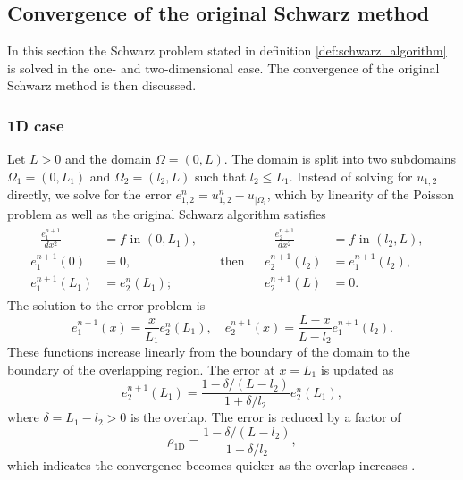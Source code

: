 \subsection{Convergence of the original Schwarz method} \label{sec:schwarz_convergence}
In this section the Schwarz problem stated in definition \ref{def:schwarz_algorithm} is solved in the one- and two-dimensional case. The convergence of the original Schwarz method is then discussed.

\subsubsection{1D case}
Let $L>0$ and the domain $\Omega = (0,L)$. The domain is split into two subdomains $\Omega_1 = (0,L_1)$ and $\Omega_2 = (l_2,L)$ such that $l_2\leq L_1$. Instead of solving for $u_{1,2}$ directly, we solve for the error $e^n_{1,2} = u^{n}_{1,2} - u_{|\Omega_i}$, which by linearity of the Poisson problem as well as the original Schwarz algorithm satisfies
\[
    \begin{array}{cc}
        \begin{aligned}
            -\frac{e_1^{n+1}}{d x^2} & = f           \text { in } (0,L_1), &                   \\
            e_1^{n+1}(0)             & = 0,                                & \quad \text{then} \\
            e_1^{n+1}(L_1)           & = e_2^n(L_1);                       &
        \end{aligned} &
        \begin{aligned}
            -\frac{e_2^{n+1}}{d x^2} & = f                \text { in } (l_2, L), & \\
            e_2^{n+1}(l_2)           & = e_1^{n+1}(l_2),                         & \\
            e_2^{n+1}(L)             & = 0.                                      &
        \end{aligned}
    \end{array}
\]
The solution to the error problem is
\[
    e_1^{n+1}(x) = \frac{x}{L_1}e_2^n(L_1), \quad e_2^{n+1}(x) = \frac{L-x}{L - l_2}e_1^{n+1}(l_2).
\]
These functions increase linearly from the boundary of the domain to the boundary of the overlapping region. The error at $x = L_1$ is updated as
\[
    e_2^{n+1}(L_1) = \frac{1 - \delta/(L-l_2)}{1 + \delta/l_2} e_2^n(L_1),
\]
where $\delta = L_1 - l_2 > 0 $ is the overlap. The error is reduced by a factor of
\begin{equation}
    \rho_{\text{1D}} = \frac{1 - \delta/(L-l_2)}{1 + \delta/l_2},
    \label{eq:1D_Schwarz_convergence}
\end{equation}
which indicates the convergence becomes quicker as the overlap increases \cite[Section 1.5.1]{schwarz_methods_Dolean_2015}.

